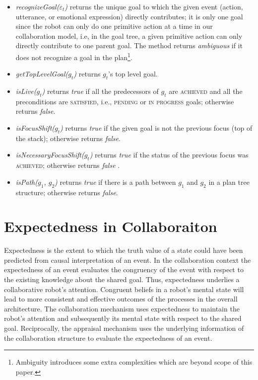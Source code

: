 \documentclass{aamas2016_extendedabstract}
\begin{document}
\vspace*{-3mm}
\begin{itemize}[leftmargin=2pt]
  \setlength\itemsep{0.01mm}
  \item \textit{recognizeGoal($\varepsilon_t$)} returns the unique goal to which
  the given event (action, utterance, or emotional expression) directly
  contributes; it is only one goal since the robot can only do one primitive
  action at a time in our collaboration model, i.e, in the goal tree, a given
  primitive action can only directly contribute to one parent goal. The method
  returns \textit{ambiguous} if it does not recognize a goal in the
  plan\footnote{Ambiguity introduces some extra complexities which are beyond
  scope of this paper.}.
  
  \item \textit{getTopLevelGoal($g_t$)} returns $g_t$'s top level goal.
  
  \item \textit{isLive($g_t$)} returns \textit{true} if all the predecessors of
  $g_t$ are \textsc{achieved} and all the preconditions are \textsc{satisfied},
  i.e., \textsc{pending} or \textsc{in progress} goals; otherwise returns \textit{false}.
  
  \item \textit{isFocusShift($g_t$)} returns \textit{true} if the given
  goal is not the previous focus (top of the stack); otherwise returns
  \textit{false}.
  
  \item \textit{isNecessaryFocusShift($g_t$)} returns \textit{true} if the
  status of the previous focus was \textsc{achieved}; otherwise returns
  \textit{false} \cite{rich:focused-unfocused-users}.
  
  \item \textit{isPath($g_1$, $g_2$)} returns \textit{true} if there is a path
  between $g_1$ and $g_2$ in a plan tree structure; otherwise returns
  \textit{false}.
\end{itemize}

\vspace*{-6mm}
\section{Expectedness in Collaboraiton}

Expectedness is the extent to which the truth value of a state could have been
predicted from causal interpretation of an event. In the collaboration context
the expectedness of an event evaluates the congruency of the event with respect
to the existing knowledge about the shared goal. Thus, expectedness underlies a
collaborative robot's attention. Congruent beliefs in a robot's mental state
will lead to more consistent and effective outcomes of the processes in the
overall architecture. The collaboration mechanism uses expectedness to maintain
the robot's attention and subsequently its mental state with respect to the
shared goal. Reciprocally, the appraisal mechanism uses the underlying
information of the collaboration structure to evaluate the expectedness of an
event.
\end{document}

